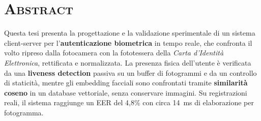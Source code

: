 \chapter*{\scshape{Abstract}}
Questa tesi presenta la progettazione e la validazione sperimentale di un sistema client-server per l'\textbf{autenticazione biometrica} in tempo reale, che confronta il volto ripreso dalla fotocamera con la fototessera della \textit{Carta d'Identità Elettronica}, rettificata e normalizzata.
La presenza fisica dell'utente è verificata da una \textbf{liveness detection} passiva su un buffer di fotogrammi e da un controllo di staticità, mentre gli embedding facciali sono confrontati tramite \textbf{similarità coseno} in un database vettoriale, senza conservare immagini.
Su registrazioni reali, il sistema raggiunge un EER del 4,8\% con circa 14~ms di elaborazione per fotogramma.



